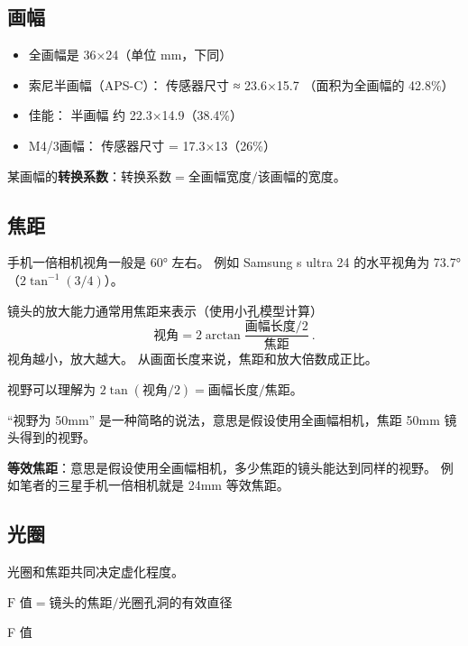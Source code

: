 
\subsection{画幅}
\begin{itemize}
\item 全画幅是 36×24（单位 mm，下同）
\item 索尼半画幅（APS-C）： 传感器尺寸 ≈ 23.6×15.7 （面积为全画幅的 42.8\%）
\item 佳能： 半画幅 约 22.3×14.9（38.4\%）
\item M4/3画幅： 传感器尺寸 = 17.3×13（26\%）
\end{itemize}

某画幅的\textbf{转换系数}：$\text{转换系数} = \text{全画幅宽度}/\text{该画幅的宽度}$。

\subsection{焦距}
手机一倍相机视角一般是 60° 左右。 例如 Samsung s ultra 24 的水平视角为 73.7°（$2\tan^{-1}(3/4)$）。

镜头的放大能力通常用焦距来表示（使用小孔模型计算）
\begin{equation}
\text{视角} = 2\arctan{\frac{\text{画幅长度/2}}{\text{焦距}}}~.
\end{equation}
视角越小，放大越大。 从画面长度来说，焦距和放大倍数成正比。

视野可以理解为 $2\tan(\text{视角}/2) = \text{画幅长度}/{\text{焦距}}$。

“视野为 50mm” 是一种简略的说法，意思是假设使用全画幅相机，焦距 50mm 镜头得到的视野。

\textbf{等效焦距}：意思是假设使用全画幅相机，多少焦距的镜头能达到同样的视野。 例如笔者的三星手机一倍相机就是 24mm 等效焦距。


\subsection{光圈}
光圈和焦距共同决定虚化程度。

$\text{F 值} = \text{镜头的焦距}/\text{光圈孔洞的有效直径}$

F 值